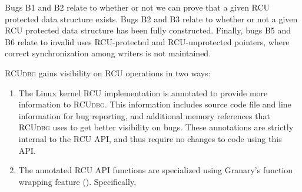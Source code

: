 \documentclass[preprint]{sigplanconf}
\newcommand{\toolname}[1]{{\scshape #1}}
\begin{document}
Bugs B1 and B2 relate to whether or not we can prove that a given RCU protected data structure exists. Bugs B2 and B3 relate to whether or not a given RCU protected data structure has been fully constructed. Finally, bugs B5 and B6 relate to invalid uses RCU-protected and RCU-unprotected pointers, where correct synchronization among writers is not maintained.



\toolname{RCUdbg} gains visibility on RCU operations in two ways: \begin{enumerate}
	\item The Linux kernel RCU implementation is annotated to provide more information to \toolname{RCUdbg}. This information includes source code file and line information for bug reporting, and additional memory references that \toolname{RCUdbg} uses to get better visibility on bugs. These annotations are strictly internal to the RCU API, and thus require no changes to code using this API.
	\item The annotated RCU API functions are specialized using Granary's function wrapping feature (). Specifically, 
\end{enumerate}





%
\end{document}
